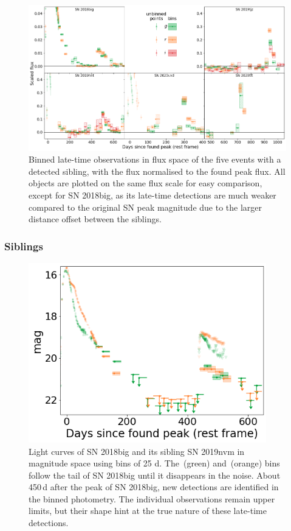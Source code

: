 \documentclass[a4paper,oneside,12pt, class=Latex/Classes/PhDthesisPSnPDF, crop=false]{standalone}
\begin{document}
\begin{figure}[h!]
 \centering
 \includegraphics[width=\textwidth]{../Images/chapter_3/sibling_norm_plots.png}
 \caption[Recovered sibling transients.]{Binned late-time observations in flux space of the five events with a detected sibling, with the flux normalised to the found peak flux. All objects are plotted on the same flux scale for easy comparison, except for SN 2018big, as its late-time detections are much weaker compared to the original SN peak magnitude due to the larger distance offset between the siblings.}
 \label{sibling_plots}
\end{figure}

\subsubsection{Siblings}
\begin{figure}
 \centering
 \includegraphics[width=0.921\textwidth]{../Images/chapter_3/ted.png}
 \caption[Light curve of SN 2018big and its sibling SN 2019nvm.]{Light curves of SN 2018big and its sibling SN 2019nvm in magnitude space using bins of 25 d. The \ztfg\,(green) and \ztfr\,(orange) bins follow the tail of SN 2018big until it disappears in the noise. About 450\,d after the peak of SN 2018big, new detections are identified in the binned photometry. The individual observations remain upper limits, but their shape hint at the true nature of these late-time detections.}
 \label{sibling_example}
\end{figure}
\end{document}
